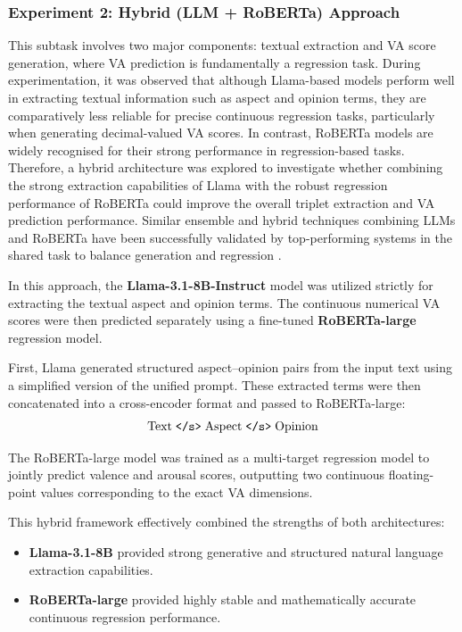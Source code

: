 \documentclass{article}
\begin{document}
\subsubsection{Experiment 2: Hybrid (LLM + RoBERTa) Approach}

This subtask involves two major components: textual extraction and VA score generation, where VA prediction is fundamentally a regression task. During experimentation, it was observed that although Llama-based models perform well in extracting textual information such as aspect and opinion terms, they are comparatively less reliable for precise continuous regression tasks, particularly when generating decimal-valued VA scores. In contrast, RoBERTa models are widely recognised for their strong performance in regression-based tasks. Therefore, a hybrid architecture was explored to investigate whether combining the strong extraction capabilities of Llama with the robust regression performance of RoBERTa could improve the overall triplet extraction and VA prediction performance. Similar ensemble and hybrid techniques combining LLMs and RoBERTa have been successfully validated by top-performing systems in the shared task to balance generation and regression \cite{de2026quadai}.

In this approach, the \textbf{Llama-3.1-8B-Instruct} model was utilized strictly for extracting the textual aspect and opinion terms. The continuous numerical VA scores were then predicted separately using a fine-tuned \textbf{RoBERTa-large} regression model.

First, Llama generated structured aspect–opinion pairs from the input text using a simplified version of the unified prompt. These extracted terms were then concatenated into a cross-encoder format and passed to RoBERTa-large:
\begin{equation}
\text{Text} \; \text{\texttt{</s>}} \; \text{Aspect} \; \text{\texttt{</s>}} \; \text{Opinion}
\end{equation}

The RoBERTa-large model was trained as a multi-target regression model to jointly predict valence and arousal scores, outputting two continuous floating-point values corresponding to the exact VA dimensions.

This hybrid framework effectively combined the strengths of both architectures:
\begin{itemize}
    \item \textbf{Llama-3.1-8B} provided strong generative and structured natural language extraction capabilities.
    \item \textbf{RoBERTa-large} provided highly stable and mathematically accurate continuous regression performance.
\end{itemize}
\end{document}
